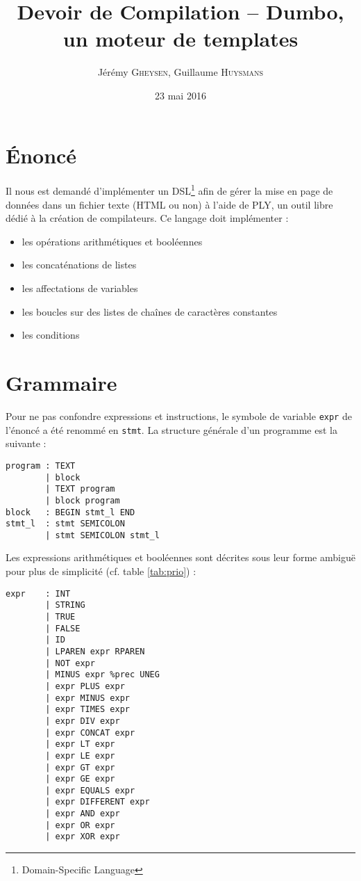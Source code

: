 \documentclass[12pt,twocolumn]{article}
\title{Devoir de Compilation -- Dumbo, un moteur de templates}
\author{Jérémy \textsc{Gheysen}, Guillaume \textsc{Huysmans}}
\date{23 mai 2016}
\begin{document}
\maketitle


\section{Énoncé}
Il nous est demandé d'implémenter un DSL\footnote{Domain-Specific Language}
afin de gérer la mise en page de données dans un fichier texte (HTML ou non)
à l'aide de PLY, un outil libre dédié à la création de compilateurs.
Ce langage doit implémenter :
\begin{itemize}
\item les opérations arithmétiques et booléennes
\item les concaténations de listes
\item les affectations de variables
\item les boucles sur des listes de chaînes de caractères constantes
\item les conditions
\end{itemize}


\section{Grammaire}
Pour ne pas confondre expressions et instructions, le symbole de variable
\texttt{expr} de l'énoncé a été renommé en \texttt{stmt}.
La structure générale d'un programme est la suivante :
\begin{verbatim}
program : TEXT
        | block
        | TEXT program
        | block program
block   : BEGIN stmt_l END
stmt_l  : stmt SEMICOLON
        | stmt SEMICOLON stmt_l
\end{verbatim}

Les expressions arithmétiques et booléennes sont décrites
sous leur forme ambiguë pour plus de simplicité
(cf. table \ref{tab:prio}) :
\begin{verbatim}
expr    : INT
        | STRING
        | TRUE
        | FALSE
        | ID
        | LPAREN expr RPAREN
        | NOT expr
        | MINUS expr %prec UNEG
        | expr PLUS expr
        | expr MINUS expr
        | expr TIMES expr
        | expr DIV expr
        | expr CONCAT expr
        | expr LT expr
        | expr LE expr
        | expr GT expr
        | expr GE expr
        | expr EQUALS expr
        | expr DIFFERENT expr
        | expr AND expr
        | expr OR expr
        | expr XOR expr
\end{verbatim}
\end{document}
